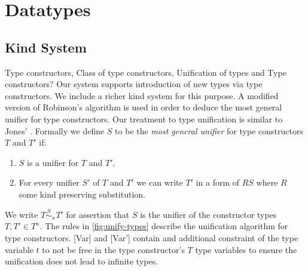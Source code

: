 \chapter{\qub{} Datatypes}\label{chp:datatypes}

\section{Kind System}\label{sec:kind-system}
{\color{red}Type constructors, Class of type constructors, Unification of types and Type constructors?}
Our system supports introduction of new types via type constructors. We include a
richer kind system for this purpose. A modified version of Robinson's algorithm \citeyearpar{robinson_machine-oriented_1965}
is used in order to deduce the most general unifier for type constructors. Our treatment to type unification
is similar to Jones' \citeyearpar{jones_system_1993}.
Formally we define $S$ to be the {\it most general unifier} for type constructors $T$ and $T'$ if:
\begin{enumerate}
  \item $S$ is a unifier for $T$ and $T'$.
  \item For every unifier $S'$ of $T$ and $T'$ we can write $T'$ in a form of
    $R S$ where $R$ some kind preserving substitution.
\end{enumerate}
We write $T \overset{S}{\sim}_{\kappa} T'$ for assertion that $S$ is the unifier
of the constructor types $T, T' \in T^{\kappa}$. The rules in \cref{fig:unify-types}
describe the unification algorithm for type constructors. [Var] and [Var'] contain
and additional constraint of the type variable $t$ to not be free in the type constructor's $T$
type variables to ensure the unification does not lead to infinite types.

